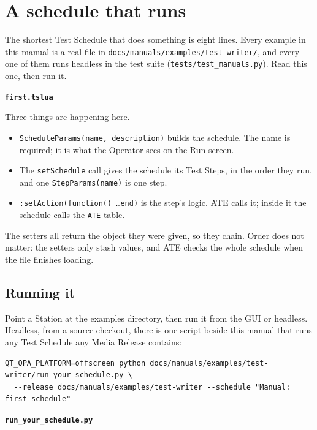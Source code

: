 \chapter{A schedule that runs}\label{ch:a-schedule-that-runs}

The shortest Test Schedule that does something is eight lines. Every example in this manual
is a real file in \texttt{docs/manuals/examples/test-writer/}, and every one of them runs
headless in the test suite (\texttt{tests/test\_manuals.py}). Read this one, then run it.

\noindent\textbf{\texttt{first.tslua}}\par


Three things are happening here.

\begin{itemize}
  \item \texttt{ScheduleParams(name, description)} builds the schedule. The name is required;
    it is what the Operator sees on the Run screen.
  \item The \texttt{setSchedule} call gives the schedule its Test Steps, in the order they
    run, and one \texttt{StepParams(name)} is one step.
  \item \texttt{:setAction(function() \dots end)} is the step's logic. ATE calls it; inside it
    the schedule calls the \texttt{ATE} table.
\end{itemize}

The setters all return the object they were given, so they chain. Order does not matter: the
setters only stash values, and ATE checks the whole schedule when the file finishes loading.

\section{Running it}

Point a Station at the examples directory, then run it from the GUI or headless. Headless, from
a source checkout, there is one script beside this manual that runs any Test Schedule any
Media Release contains:

\begin{lstlisting}[language=ATEShell]
QT_QPA_PLATFORM=offscreen python docs/manuals/examples/test-writer/run_your_schedule.py \
  --release docs/manuals/examples/test-writer --schedule "Manual: first schedule"
\end{lstlisting}

\noindent\textbf{\texttt{run\_your\_schedule.py}}\par


